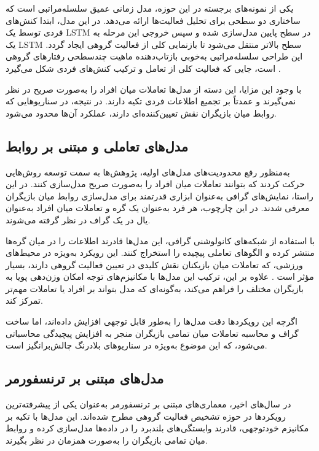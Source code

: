 \documentclass[12pt]{report}
\begin{document}
یکی از نمونه‌های برجسته در این حوزه، مدل زمانی عمیق سلسله‌مراتبی است که ساختاری دو سطحی برای تحلیل فعالیت‌ها ارائه می‌دهد. در این مدل، ابتدا کنش‌های فردی توسط یک LSTM در سطح پایین مدل‌سازی شده و سپس خروجی این مرحله به یک LSTM سطح بالاتر منتقل می‌شود تا بازنمایی کلی از فعالیت گروهی ایجاد گردد. این طراحی سلسله‌مراتبی به‌خوبی بازتاب‌دهنده ماهیت چندسطحی رفتارهای گروهی است، جایی که فعالیت کلی از تعامل و ترکیب کنش‌های فردی شکل می‌گیرد \cite{three}.

با وجود این مزایا، این دسته از مدل‌ها تعاملات میان افراد را به‌صورت صریح در نظر نمی‌گیرند و عمدتاً بر تجمیع اطلاعات فردی تکیه دارند. در نتیجه، در سناریوهایی که روابط میان بازیگران نقش تعیین‌کننده‌ای دارند، عملکرد آن‌ها محدود می‌شود.

\subsection[مدل‌های تعاملی و مبتنی بر روابط]{مدل‌های تعاملی و مبتنی بر روابط}
به‌منظور رفع محدودیت‌های مدل‌های اولیه، پژوهش‌ها به سمت توسعه روش‌هایی حرکت کردند که بتوانند تعاملات میان افراد را به‌صورت صریح مدل‌سازی کنند. در این راستا، نمایش‌های گرافی به‌عنوان ابزاری قدرتمند برای مدل‌سازی روابط میان بازیگران معرفی شدند. در این چارچوب، هر فرد به‌عنوان یک گره و تعاملات میان افراد به‌عنوان یال در یک گراف در نظر گرفته می‌شوند.

با استفاده از شبکه‌های کانولوشنی گرافی، این مدل‌ها قادرند اطلاعات را در میان گره‌ها منتشر کرده و الگوهای تعاملی پیچیده را استخراج کنند. این رویکرد به‌ویژه در محیط‌های ورزشی، که تعاملات میان بازیکنان نقش کلیدی در تعیین فعالیت گروهی دارند، بسیار مؤثر است \cite{five}. علاوه بر این، ترکیب این مدل‌ها با مکانیزم‌های توجه امکان وزن‌دهی پویا به بازیگران مختلف را فراهم می‌کند، به‌گونه‌ای که مدل بتواند بر افراد یا تعاملات مهم‌تر تمرکز کند.

اگرچه این رویکردها دقت مدل‌ها را به‌طور قابل توجهی افزایش داده‌اند، اما ساخت گراف و محاسبه تعاملات میان تمامی بازیگران منجر به افزایش پیچیدگی محاسباتی می‌شود، که این موضوع به‌ویژه در سناریوهای بلادرنگ چالش‌برانگیز است.

\subsection{مدل‌های مبتنی بر ترنسفورمر}
در سال‌های اخیر، معماری‌های مبتنی بر ترنسفورمر به‌عنوان یکی از پیشرفته‌ترین رویکردها در حوزه تشخیص فعالیت گروهی مطرح شده‌اند. این مدل‌ها با تکیه بر مکانیزم خودتوجهی، قادرند وابستگی‌های بلندبرد را در داده‌ها مدل‌سازی کرده و روابط میان تمامی بازیگران را به‌صورت همزمان در نظر بگیرند.
\end{document}
